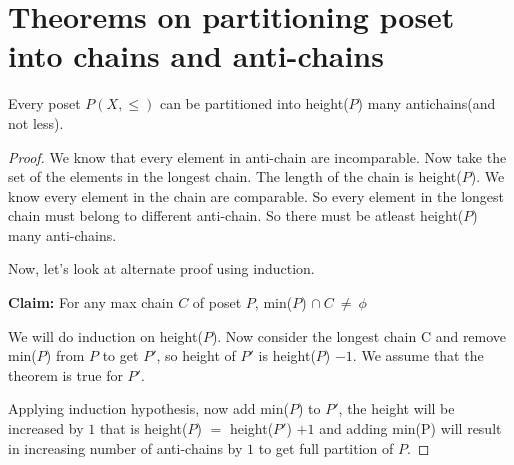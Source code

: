 \section{Theorems on partitioning poset into chains and anti-chains}
\begin{theorem}
Every poset $P(X,\leq)$ can be partitioned into height($P$) many antichains(and not less).
\begin{proof}
We know that every element in anti-chain are incomparable. Now take the set of the elements in the longest chain. The length of the chain is height($P$). We know every element in the chain are comparable. So every element in the longest chain must belong to different anti-chain. So there must be atleast height($P$) many anti-chains.

Now, let's look at alternate proof using induction.

\textbf{Claim:} For any max chain $C$ of poset $P$, min($P$) $\cap ~ C ~\neq~ \phi$

We will do induction on height($P$). Now consider the longest chain C and remove min($P$) from $P$ to get $P'$, so height of $P'$ is height($P$) $ - 1$. We assume that the theorem is true for $P'$.

Applying induction hypothesis, now add min($P$) to $P'$, the height will be increased by $1$ that is height($P$) $=$ height($P'$) $+ 1$ and adding min(P) will result in increasing number of anti-chains by $1$ to get full partition of $P$.
\end{proof}
\end{theorem}
